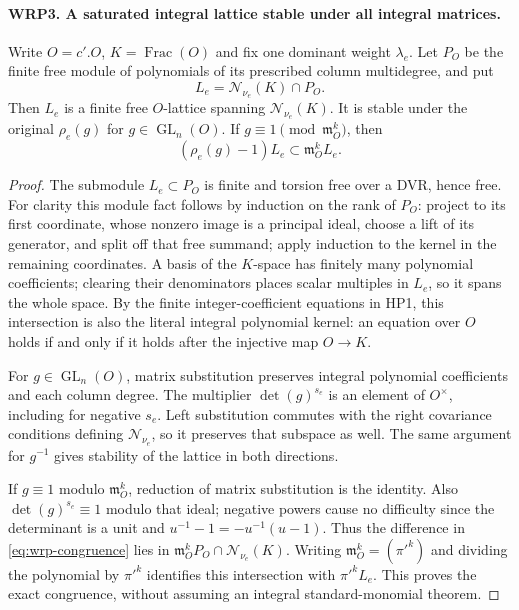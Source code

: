 \documentclass[11pt,a4paper]{article}
\numberwithin{equation}{section}
\theoremstyle{remark}\newtheorem{remark}[theorem]{Remark}
\begin{document}
\paragraph{WRP3. A saturated integral lattice stable under all integral matrices.}
\label{claim:WRP3}
Write $O=c'.O$, $K=\operatorname{Frac}(O)$ and fix one dominant
weight $\lambda_e$.  Let $P_O$ be the finite free module of
polynomials of its prescribed column multidegree, and put
\[
              L_e=\mathcal N_{\nu_e}(K)\cap P_O.
\]
Then $L_e$ is a finite free $O$-lattice spanning
$\mathcal N_{\nu_e}(K)$.  It is stable under the original
$\rho_e(g)$ for $g\in\operatorname{GL}_n(O)$.  If
$g\equiv1\pmod{\mathfrak m_O^k}$, then
\begin{equation}\label{eq:wrp-congruence}
             (\rho_e(g)-1)L_e\subset\mathfrak m_O^k L_e.
\end{equation}
\begin{proof}
The submodule $L_e\subset P_O$ is finite and torsion free
over a DVR, hence free.  For clarity this module fact follows
by induction on the rank of $P_O$: project to its first
coordinate, whose nonzero image is a principal ideal,
choose a lift of its generator, and split off that free
summand; apply induction to the kernel in the remaining
coordinates.  A basis of the $K$-space has finitely many
polynomial coefficients; clearing their denominators places
scalar multiples in $L_e$, so it spans the whole space.
By the finite integer-coefficient equations in HP1, this
intersection is also the literal integral polynomial kernel:
an equation over $O$ holds if and only if it holds after
the injective map $O\to K$.

For $g\in\operatorname{GL}_n(O)$, matrix substitution
preserves integral polynomial coefficients and each column
degree.  The multiplier $\det(g)^{s_e}$ is an element of
$O^\times$, including for negative $s_e$.  Left substitution
commutes with the right covariance conditions defining
$\mathcal N_{\nu_e}$, so it preserves that subspace as well.
The same argument for $g^{-1}$ gives stability of the lattice
in both directions.

If $g\equiv1$ modulo $\mathfrak m_O^k$, reduction of matrix
substitution is the identity.  Also
$\det(g)^{s_e}\equiv1$ modulo that ideal; negative powers
cause no difficulty since the determinant is a unit and
$u^{-1}-1=-u^{-1}(u-1)$.  Thus the difference in
\eqref{eq:wrp-congruence} lies in
$\mathfrak m_O^kP_O\cap\mathcal N_{\nu_e}(K)$.
Writing $\mathfrak m_O^k=(\pi'^k)$ and dividing the
polynomial by $\pi'^k$ identifies this intersection with
$\pi'^kL_e$.  This proves the exact congruence, without
assuming an integral standard-monomial theorem.
\end{proof}
\end{document}
